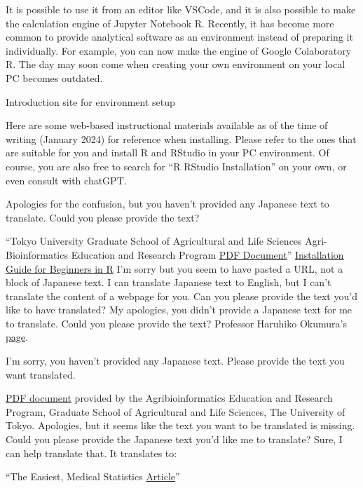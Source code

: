 \documentclass[
  a4paper,
]{book}
\begin{document}
It is possible to use it from an editor like VSCode, and it is also
possible to make the calculation engine of Jupyter Notebook R. Recently,
it has become more common to provide analytical software as an
environment instead of preparing it individually. For example, you can
now make the engine of Google Colaboratory R. The day may soon come when
creating your own environment on your local PC becomes outdated.

Introduction site for environment setup

Here are some web-based instructional materials available as of the time
of writing (January 2024) for reference when installing. Please refer to
the ones that are suitable for you and install R and RStudio in your PC
environment. Of course, you are also free to search for ``R RStudio
Installation'' on your own, or even consult with chatGPT.

Apologies for the confusion, but you haven't provided any Japanese text
to translate. Could you please provide the text?

``Tokyo University Graduate School of Agricultural and Life Sciences
Agri-Bioinformatics Education and Research Program
\href{https://www.iu.a.u-tokyo.ac.jp/textbook/R/R1.010_win.pdf}{PDF
Document}''
\href{https://syunsuke.github.io/r_install_guide_for_beginners/}{Installation
Guide for Beginners in R} I'm sorry but you seem to have pasted a URL,
not a block of Japanese text. I can translate Japanese text to English,
but I can't translate the content of a webpage for you. Can you please
provide the text you'd like to have translated? My apologies, you didn't
provide a Japanese text for me to translate. Could you please provide
the text? Professor Haruhiko Okumura's
\href{https://okumuralab.org/~okumura/stat/R-win.html}{page}.

I'm sorry, you haven't provided any Japanese text. Please provide the
text you want translated.

\href{https://www.iu.a.u-tokyo.ac.jp/textbook/R/R1.010_mac.pdf}{PDF
document} provided by the Agribioinformatics Education and Research
Program, Graduate School of Agricultural and Life Sciences, The
University of Tokyo. Apologies, but it seems like the text you want to
be translated is missing. Could you please provide the Japanese text
you'd like me to translate? Sure, I can help translate that. It
translates to:

``The Easiest, Medical Statistics
\href{https://best-biostatistics.com/r/rstudio_start.html\#i-3}{Article}''
\end{document}
